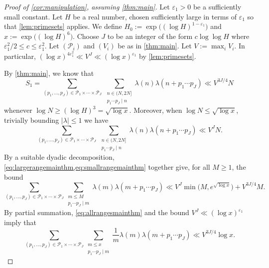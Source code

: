 \documentclass[11pt]{amsart}
\theoremstyle{definition}
\renewcommand{\leq}{\leqslant}
\renewcommand{\geq}{\geqslant}
\newcommand{\abs}[1]{\left|#1\right|}
\newcommand{\eps}{\varepsilon}
\newcommand{\primes}{\mathcal{P}}
\newcommand{\cstH}{\eps_1}
\newcommand{\curlyL}{V}
\newcommand{\curlyLpower}{V^{\repR}}
\newcommand{\curlyLexp}[1]{V^{#1}}
\newcommand{\repR}{J}
\begin{document}
\begin{proof}[Proof of \cref{cor:manipulation}, assuming \cref{thm:main}]
Let $\cstH > 0$ be a sufficiently small constant. Let $H$ be a real number, chosen sufficiently large in terms of $\cstH$ so that \cref{lem:primesets} applies. We define ${H_0 := \exp \big((\log H)^{1-\cstH}\big)}$ and $x := \exp\big((\log H)^{6}\big)$. Choose $\repR$ to be an integer of the form $c \log \log H$ where $\cstH^2/2\leq c \leq \cstH^2$. Let $(\primes_i)$ and $(\curlyL_i)$ be as in \cref{thm:main}. Let $\curlyL := \max_i \curlyL_i$. In particular, ${(\log x)^{4\cstH^2} \ll \curlyLpower \ll (\log x)^{\cstH}}$ by \cref{lem:primesets}.

By \cref{thm:main}, we know that 
\begin{equation}
\label{eq:largerangemainthm}
	S_1 = \sum_{(p_1, \ldots, p_{\repR})\in \primes_1\times \cdots \times \primes_{\repR}} \, \sum_{\substack{n\in (N, 2N] \\ p_1\cdots p_{\repR} \mid n}}\lambda(n) \lambda(n+p_1\cdots p_{\repR}) \ll \curlyLexp{3\repR/4} N
\end{equation}
whenever $\log N \geq (\log H)^3 = \sqrt{\log x}$. Moreover, when ${\log N \leq \sqrt{\log x}}$, trivially bounding $\abs{\lambda} \leq 1$ we have
\begin{equation}
\label{eq:smallrangemainthm}
	\sum_{(p_1, \ldots, p_{\repR})\in \primes_1\times \cdots \times \primes_{\repR}} \, \sum_{\substack{n\in (N, 2N] \\ p_1\cdots p_{\repR} \mid n}}\lambda(n) \lambda(n+p_1\cdots p_{\repR}) \ll \curlyLpower N.
\end{equation}
By a suitable dyadic decomposition, \cref{eq:largerangemainthm,eq:smallrangemainthm} together give, for all $M\geq 1$, the bound
\begin{equation}
\label{eq:allrangesmainthm}
	\sum_{(p_1, \ldots, p_{\repR})\in \primes_1\times \cdots \times \primes_{\repR}}  \sum_{\substack{m\leq M \\ p_1\cdots p_{\repR} \mid m}}\lambda(m) \lambda(m+p_1\cdots p_{\repR}) \ll \curlyLpower \min\!\big(M, e^{\sqrt{\log x}}\big) + \curlyLexp{3\repR/4} M.
\end{equation}
By partial summation, \cref{eq:allrangesmainthm} and the bound $\curlyLpower\ll (\log{x})^{\cstH}$ imply that
\begin{equation}
\label{eq:mainthmpartialsumm}
	\sum_{(p_1, \ldots, p_{\repR})\in \primes_1\times \cdots \times \primes_{\repR}}  \sum_{\substack{m\leq x \\ p_1\cdots p_{\repR} \mid m}}\frac{1}{m} \lambda(m) \lambda(m+p_1\cdots p_{\repR}) \ll \curlyLexp{3\repR/4} \log x.
\end{equation}


\end{proof}
\end{document}
